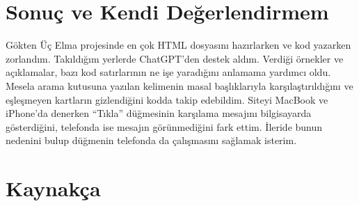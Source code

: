 \documentclass[12pt,a4paper]{article}
\begin{document}
\section{Sonuç ve Kendi Değerlendirmem}
Gökten Üç Elma projesinde en çok HTML dosyasını hazırlarken ve kod yazarken zorlandım. Takıldığım yerlerde ChatGPT’den destek aldım. Verdiği örnekler ve açıklamalar, bazı kod satırlarının ne işe yaradığını anlamama yardımcı oldu. Mesela arama kutusuna yazılan kelimenin masal başlıklarıyla karşılaştırıldığını ve eşleşmeyen kartların gizlendiğini kodda takip edebildim. Siteyi MacBook ve iPhone’da denerken “Tıkla” düğmesinin karşılama mesajını bilgisayarda gösterdiğini, telefonda ise mesajın görünmediğini fark ettim. İleride bunun nedenini bulup düğmenin telefonda da çalışmasını sağlamak isterim.

\section{Kaynakça}
\end{document}
